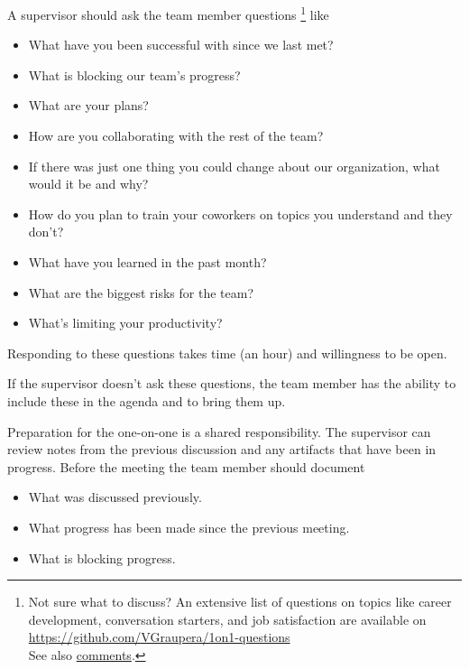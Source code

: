 A supervisor should ask the team member questions
\footnote{Not sure what to discuss? An extensive list of questions on topics like career development, conversation starters, and job satisfaction are available on 
\href{https://github.com/VGraupera/1on1-questions}{https://github.com/VGraupera/1on1-questions}\\
See also \href{https://news.ycombinator.com/item?id=22341138}{comments}.}
like
\begin{itemize}
    \item What have you been successful with since we last met?
    \item What is blocking our team's progress?
    \item What are your plans?
    \item How are you collaborating with the rest of the team?
    \item If there was just one thing you could change about our organization, what would it be and why?
    \item How do you plan to train your coworkers on topics you understand and they don't?
    \item What have you learned in the past month?
    \item What are the biggest risks for the team?
    \item What's limiting your productivity?
\end{itemize}
Responding to these questions takes time (an hour) and willingness to be open. 

If the supervisor doesn't ask these questions, the team member has the ability to include these in the agenda and to bring them up. 

Preparation for the one-on-one is a shared responsibility. The supervisor can review notes from the previous discussion and any artifacts that have been in progress. Before the meeting the team member should document
\begin{itemize}
    \item What was discussed previously.
    \item What progress has been made since the previous meeting.
    \item What is blocking progress.
\end{itemize}

